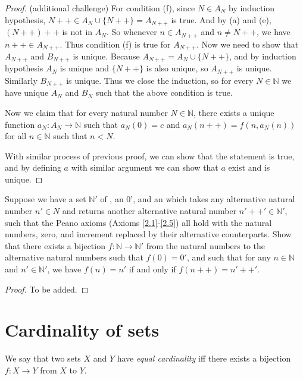 \begin{proof}{(additional challenge)}
For condition (f), since \(N \in A_N\) by induction hypothesis, \(N++ \in A_N \cup \{N++\} = A_{N++}\) is true.
And by (a) and (e), \((N++)++\) is not in \(A_N\).
So whenever \(n \in A_{N++}\) and \(n \neq N++\), we have \(n++ \in A_{N++}\).
Thus condition (f) is true for \(A_{N++}\).
Now we need to show that \(A_{N++}\) and \(B_{N++}\) is unique.
Because \(A_{N++} = A_N \cup \{N++\}\), and by induction hypothesis \(A_N\) is unique and \(\{N++\}\) is also unique, so \(A_{N++}\) is unique.
Similarly \(B_{N++}\) is unique.
Thus we close the induction, so for every \(N \in \mathds{N}\) we have unique \(A_N\) and \(B_N\) such that the above condition is true.

Now we claim that for every natural number \(N \in \mathds{N}\), there exists a unique function \(a_N : A_N \to \mathds{N}\) such that \(a_N(0) = c\) and \(a_N(n++) = f(n, a_{N}(n))\) for all \(n \in \mathds{N}\) such that \(n < N\).

With similar process of previous proof, we can show that the statement is true, and by defining \(a\) with similar argument we can show that \(a\) exist and is unique.
\end{proof}

\begin{exercise}\label{ex 3.5.13}
Suppose we have a set \(\mathds{N}'\) of , an  0', and an  which takes any alternative natural number \(n' \in N\) and returns another alternative natural number \(n'++' \in \mathds{N}'\), such that the Peano axioms (Axioms \ref{2.1}-\ref{2.5}) all hold with the natural numbers, zero, and increment replaced by their alternative counterparts.
Show that there exists a bijection \(f : \mathds{N} \to \mathds{N}'\) from the natural numbers to the alternative natural numbers such that \(f(0) = 0'\), and such that for any \(n \in \mathds{N}\) and \(n' \in \mathds{N}'\), we have \(f(n) = n'\) if and only if \(f(n++) = n'++'\).
\end{exercise}

\begin{proof}
To be added.
\end{proof}

\section{Cardinality of sets}

\begin{definition}\label{3.6.1}
We say that two sets \(X\) and \(Y\) have \emph{equal cardinality} iff there exists a bijection \(f : X \to Y\) from \(X\) to \(Y\).
\end{definition}

